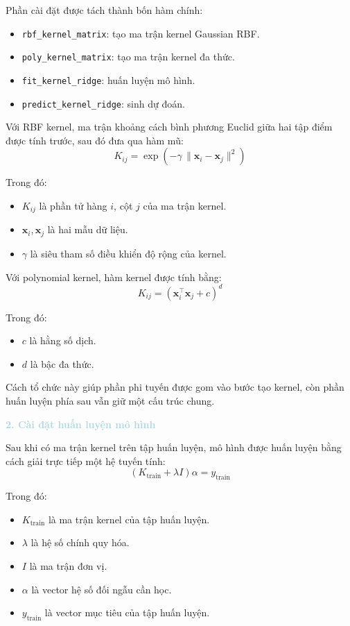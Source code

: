 Phần cài đặt được tách thành bốn hàm chính:
\begin{itemize}
    \item \texttt{rbf\_kernel\_matrix}: tạo ma trận kernel Gaussian RBF.
    \item \texttt{poly\_kernel\_matrix}: tạo ma trận kernel đa thức.
    \item \texttt{fit\_kernel\_ridge}: huấn luyện mô hình.
    \item \texttt{predict\_kernel\_ridge}: sinh dự đoán.
\end{itemize}

Với RBF kernel, ma trận khoảng cách bình phương Euclid giữa hai tập điểm được tính trước, sau đó đưa qua hàm mũ:
\begin{equation}
    K_{ij} = \exp\!\left(-\gamma\,\|\mathbf{x}_i - \mathbf{x}_j\|^2\right)
\end{equation}

Trong đó:
\begin{itemize}
    \item $K_{ij}$ là phần tử hàng $i$, cột $j$ của ma trận kernel.
    \item $\mathbf{x}_i, \mathbf{x}_j$ là hai mẫu dữ liệu.
    \item $\gamma$ là siêu tham số điều khiển độ rộng của kernel.
\end{itemize}

Với polynomial kernel, hàm kernel được tính bằng:
\begin{equation}
    K_{ij} = (\mathbf{x}_i^\top \mathbf{x}_j + c)^d
\end{equation}

Trong đó:
\begin{itemize}
    \item $c$ là hằng số dịch.
    \item $d$ là bậc đa thức.
\end{itemize}

Cách tổ chức này giúp phần phi tuyến được gom vào bước tạo kernel, còn phần huấn luyện phía sau vẫn giữ một cấu trúc chung.

\noindent\textcolor{lightblue}{\textbf{2. Cài đặt huấn luyện mô hình}}

Sau khi có ma trận kernel trên tập huấn luyện, mô hình được huấn luyện bằng cách giải trực tiếp một hệ tuyến tính:
\begin{equation}
    (K_{\mathrm{train}} + \lambda I)\alpha = y_{\mathrm{train}}
\end{equation}

Trong đó:
\begin{itemize}
    \item $K_{\mathrm{train}}$ là ma trận kernel của tập huấn luyện.
    \item $\lambda$ là hệ số chính quy hóa.
    \item $I$ là ma trận đơn vị.
    \item $\alpha$ là vector hệ số đối ngẫu cần học.
    \item $y_{\mathrm{train}}$ là vector mục tiêu của tập huấn luyện.
\end{itemize}

